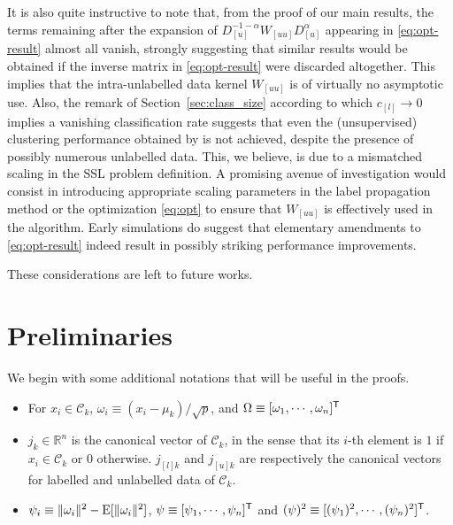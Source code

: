 \documentclass[twoside,11pt]{article}
\def\trans{{\sf T}}
\begin{document}
\medskip

It is also quite instructive to note that, from the proof of our main results, the terms remaining after the expansion of $D_{[u]}^{-1-\alpha}W_{[uu]}D_{[u]}^\alpha$ appearing in \eqref{eq:opt-result} almost all vanish, strongly suggesting that similar results would be obtained if the inverse matrix in \eqref{eq:opt-result} were discarded altogether. This implies that the intra-unlabelled data kernel $W_{[uu]}$ is of virtually no asymptotic use. Also, the remark of Section~\ref{sec:class_size} according to which $c_{[l]}\to 0$ implies a vanishing classification rate suggests that even the (unsupervised) clustering performance obtained by \citet{couillet2015kernel} is not achieved, despite the presence of possibly numerous unlabelled data. This, we believe, is due to a mismatched scaling in the SSL problem definition. A promising avenue of investigation would consist in introducing appropriate scaling parameters in the label propagation method or the optimization \eqref{eq:opt} to ensure that $W_{[uu]}$ is effectively used in the algorithm. Early simulations do suggest that elementary amendments to \eqref{eq:opt-result} indeed result in possibly striking performance improvements. 

These considerations are left to future works.


\appendix

\section{Preliminaries}

We begin with some additional notations that will be useful in the proofs.
\begin{itemize}
	\item For $x_{i}\in\mathcal{C}_{k}$, $\omega_{i}\equiv  (x_{i}-\mu_{k})/\sqrt{p}$, and $\Omega\equiv [\omega_{1},\cdots,\omega_{n}]^\trans$
	\item $j_{k}\in\mathbb{R}^{n}$ is the canonical vector of $\mathcal{C}_{k}$, in the sense that its $i$-th element is $1$ if $x_{i}\in\mathcal{C}_{k}$ or $0$ otherwise. $j_{[l]k}$ and $j_{[u]k}$ are respectively the canonical vectors for labelled and unlabelled data of $\mathcal{C}_k$.
	\item $\psi_{i}\equiv\Vert \omega_{i} \Vert^{2}-{\rm E}[\Vert \omega_{i} \Vert^{2}]$, $\psi\equiv [\psi_{1},\cdots,\psi_{n}]^\trans$ and $(\psi)^{2}\equiv [(\psi_{1})^{2},\cdots,(\psi_{n})^{2}]^\trans$.
\end{itemize}
\end{document}
